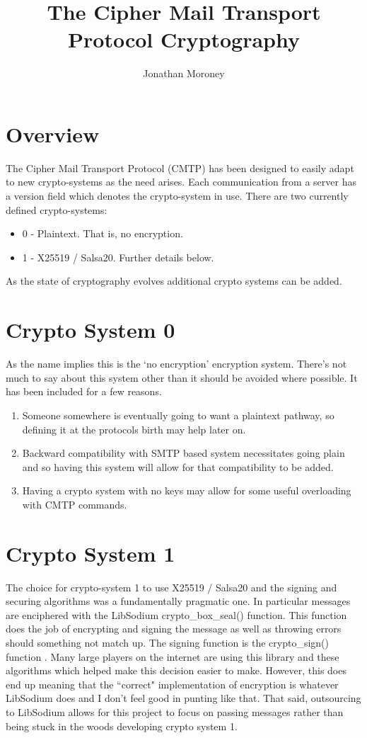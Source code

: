 \documentclass[a4paper,11pt]{article}
\title{The Cipher Mail Transport Protocol Cryptography}
\author{Jonathan Moroney}
\begin{document}
\maketitle


\section{Overview}
The Cipher Mail Transport Protocol (CMTP) has been designed to easily adapt to new crypto-systems as the need arises. Each communication from a server has a version field which denotes the crypto-system in use. There are two currently defined crypto-systems:
\begin{itemize}
  \item 0 - Plaintext. That is, no encryption.
  \item 1 - X25519 / Salsa20. Further details below.
\end{itemize}
As the state of cryptography evolves additional crypto systems can be added.
\section{Crypto System 0}
As the name implies this is the `no encryption' encryption system. There's not much to say about this system other than it should be avoided where possible. It has been included for a few reasons.
\begin{enumerate}
  \item Someone somewhere is eventually going to want a plaintext pathway, so defining it at the protocols birth may help later on.
  \item Backward compatibility with SMTP based system necessitates going plain and so having this system will allow for that compatibility to be added.
  \item Having a crypto system with no keys may allow for some useful overloading with CMTP commands.
\end{enumerate}
\section{Crypto System 1}
The choice for crypto-system 1 to use X25519 / Salsa20 and the signing and securing algorithms was a fundamentally pragmatic one. In particular messages are enciphered with the LibSodium crypto\_box\_seal() \cite{crypto-box-seal} function. This function does the job of encrypting and signing the message as well as throwing errors should something not match up. The signing function is the crypto\_sign() function \cite{crypto-sign}. Many large players on the internet are using this library and these algorithms which helped make this decision easier to make. However, this does end up meaning that the ``correct" implementation of encryption is whatever LibSodium does and I don't feel good in punting like that. That said, outsourcing to LibSodium allows for this project to focus on passing messages rather than being stuck in the woods developing crypto system 1.




\end{document}
